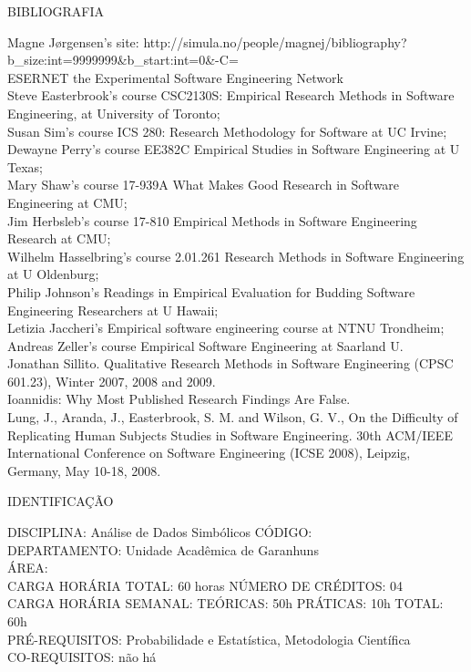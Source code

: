 \documentclass[
	12pt,				%
	openright,			%
  oneside,     %
	a4paper,			%
	english,			%
	french,				%
	spanish,			%
	brazil				%
	]{abntex2}
\begin{document}
\begin{apendicesenv}
BIBLIOGRAFIA 

Magne Jørgensen's site:
http://simula.no/people/magnej/bibliography?b\_size:int=9999999\&b\_start:int=0\&-C=\\
ESERNET  the Experimental Software Engineering Network\\
Steve Easterbrook's course CSC2130S: Empirical Research
Methods in Software Engineering, at University of Toronto;\\
Susan Sim's course ICS 280: Research Methodology for
Software at UC Irvine;\\
Dewayne Perry's course EE382C Empirical Studies in
Software Engineering at U Texas;\\
Mary Shaw's course 17-939A What Makes Good Research in
Software Engineering at CMU;\\
Jim Herbsleb's course 17-810 Empirical Methods in
Software Engineering Research at CMU;\\
Wilhelm Hasselbring's course 2.01.261 Research Methods
in Software Engineering at U Oldenburg;\\
Philip Johnson's Readings in Empirical Evaluation for
Budding Software Engineering Researchers at U Hawaii;\\
Letizia Jaccheri's Empirical software engineering
course at NTNU Trondheim;\\
Andreas Zeller's course Empirical Software Engineering
at Saarland U.\\
Jonathan Sillito. Qualitative Research Methods in Software Engineering
(CPSC 601.23), Winter 2007, 2008 and 2009.\\
Ioannidis: Why Most Published Research Findings Are False.\\
Lung, J., Aranda, J., Easterbrook, S. M. and Wilson, G. V., On the
Difficulty of Replicating Human Subjects Studies in Software
Engineering. 30th ACM/IEEE International Conference on Software
Engineering (ICSE 2008), Leipzig, Germany, May 10-18,
2008.

\newpage IDENTIFICAÇÃO

DISCIPLINA: Análise de Dados Simbólicos CÓDIGO: \\
DEPARTAMENTO: Unidade Acadêmica de Garanhuns \\
ÁREA: \\
CARGA HORÁRIA TOTAL: 60 horas NÚMERO DE CRÉDITOS: 04\\
CARGA HORÁRIA SEMANAL: TEÓRICAS: 50h PRÁTICAS: 10h TOTAL: 60h\\
PRÉ-REQUISITOS: Probabilidade e Estatística, Metodologia Científica\\
CO-REQUISITOS: não há


\end{apendicesenv}
\end{document}
